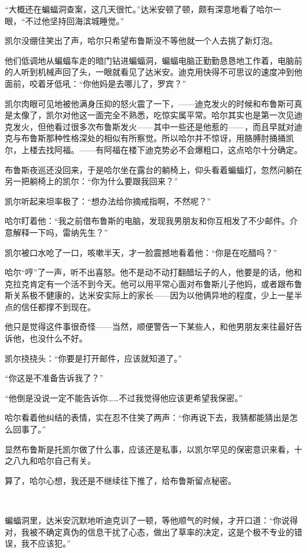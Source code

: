 \documentclass[../main]{subfiles}
\begin{document}
“大概还在蝙蝠洞查案，这几天很忙。”达米安顿了顿，颇有深意地看了哈尔一眼，“不过他坚持回海滨城睡觉。”

凯尔没绷住笑出了声，哈尔只希望布鲁斯没不等他就一个人去挑了新灯泡。

他们低调地从蝙蝠车走的暗门钻进蝙蝠洞，蝙蝠电脑正勤勤恳恳地工作着，电脑前的人听到机械声回了头，一眼就看见了达米安。迪克用快得不可思议的速度冲到他面前，咬着牙低吼：“你他妈是去哪儿了，罗宾？”

凯尔肉眼可见地被他满身压抑的怒火震了一下，——迪克发火的时候和布鲁斯可真是太像了，凯尔对他这一面完全不熟悉，吃惊实属平常。哈尔其实也是第一次见迪克发火，但他看过很多次布鲁斯发火——其中一些还是他惹的——，而且早就对迪克与布鲁斯那种性格深处的相似有所察觉。所以哈尔并不惊讶，用胳膊肘捅捅凯尔，上楼去找阿福。——有阿福在楼下迪克势必不会爆粗口，这点哈尔十分确定。

布鲁斯夜巡还没回来，于是哈尔坐在露台的躺椅上，仰头看着蝙蝠灯，忽然问躺在另一把躺椅上的凯尔：“你为什么要跟我回来？”

凯尔听起来坦率极了：“想办法给你摘戒指啊，不然呢？”

哈尔盯着他：“我之前借布鲁斯的电脑，发现我男朋友和你互相发了不少邮件。介意解释一下吗，雷纳先生？”

凯尔被口水呛了一口，咳嗽半天，才一脸震撼地看着他：“你是在吃醋吗？”

哈尔“哼”了一声，听不出喜怒。他不是动不动打翻醋坛子的人，他要是的话，他和克拉克肯定有一个活不到今天。他可以用平常心面对布鲁斯儿子他妈，或者跟布鲁斯关系极不健康的，达米安实际上的家长——因为以他俩异地的程度，少上一星半点的信任都撑不到现在。

他只是觉得这件事很奇怪——当然，顺便警告一下某些人，和他男朋友来往最好告诉他，也没什么不好。

凯尔挠挠头：“你要是打开邮件，应该就知道了。”

“你这是不准备告诉我了？”

“他倒是没说一定不能告诉你……不过我觉得他应该更希望我保密。”

哈尔看着他纠结的表情，实在忍不住笑了两声：“你再说下去，我猜都能猜出是怎么回事了。”

显然布鲁斯是托凯尔做了什么事，应该还是私事，以凯尔罕见的保密意识来看，十之八九和哈尔自己有关。

算了，哈尔心想，我还是不继续往下推了，给布鲁斯留点秘密。

~\

蝙蝠洞里，达米安沉默地听迪克训了一顿，等他顺气的时候，才开口道：“你说得对，我被不确定真伪的信息干扰了心态，做出了草率的决定，这是个极不专业的错误，我不应该犯。”
\end{document}
